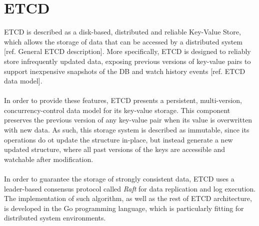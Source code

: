 \section{ETCD}
ETCD is described as a disk-based, distributed and reliable Key-Value Store, which allows the storage of data that can be accessed by a distributed system [ref. General ETCD description]. More specifically, ETCD is designed to reliably store infrequently updated data, exposing previous versions of key-value pairs to support inexpensive snapshots of the DB and watch history events [ref. ETCD data model]. \\ \\
In order to provide these features, ETCD presents a persistent, multi-version, concurrency-control data model for its key-value storage. This component preserves the previous version of any key-value pair when its value is overwritten with new data. As such, this storage system is described as immutable, since its operations do ot update the structure in-place, but instead generate a new updated structure, where all past versions of the keys are accessible and watchable after modification. \\ \\
In order to guarantee the storage of strongly consistent data, ETCD uses a leader-based consensus protocol called \textit{Raft} for data replication and log execution. The implementation of such algorithm, as well as the rest of ETCD architecture, is developed in the Go programming language, which is particularly fitting for distributed system environments.

